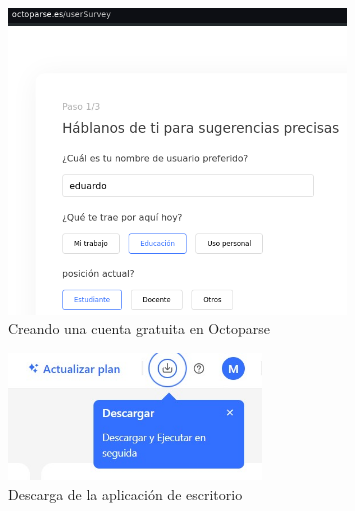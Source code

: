 \documentclass[12pt]{article}
\begin{document}
                        \newpage
                        \begin{figure}[!h]
                                \centering
                                \includegraphics[width=0.8\textwidth]{img/octoparse-1.png}
                                \caption{Creando una cuenta gratuita en Octoparse}
                        \end{figure}
                        \begin{figure}[!h]
                                \centering
                                \includegraphics[width=0.6\textwidth]{img/octoparse-2.png}
                                \caption{Descarga de la aplicación de escritorio}
                        \end{figure}
                        \newpage
\end{document}
